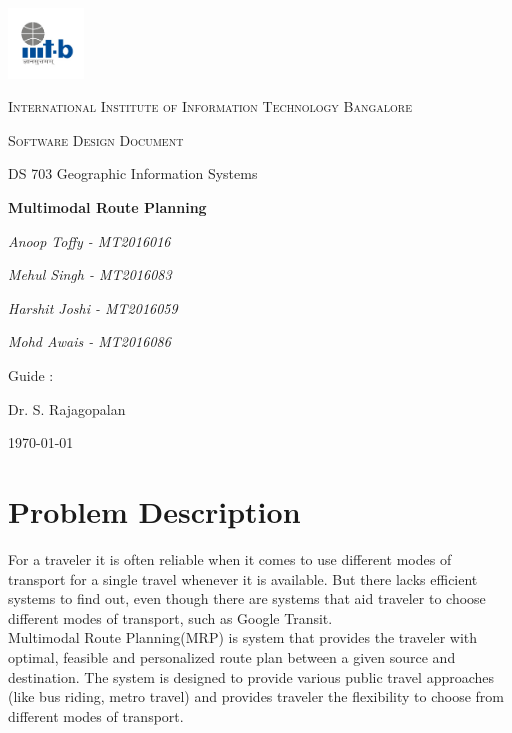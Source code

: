 \documentclass[12pt,a4paper]{article}
\begin{document}
\begin{titlepage}
	\centering
	\includegraphics[width=0.15\textwidth]{IIIT-B_logo.jpg}\par\vspace{1cm}
	{\scshape\LARGE International Institute of Information Technology Bangalore \par}
	\vspace{1cm}
	{\scshape\Large Software Design Document\par}
	{\Large DS 703 Geographic Information Systems\par}
	\vspace{1.5cm}
	{\huge\bfseries Multimodal Route Planning\par}
	\vspace{2cm}	   
	{\Large\itshape Anoop Toffy - MT2016016\par}
	{\Large\itshape Mehul Singh - MT2016083\par}		 
	{\Large\itshape Harshit Joshi - MT2016059\par}	 
	{\Large\itshape Mohd Awais - MT2016086\par}
	\vfill
	Guide : \par
	Dr. S. Rajagopalan

	\vfill

	{\large \today\par}
\end{titlepage}


\tableofcontents
\listoffigures
\listoftables
\newpage

\section{Problem Description}
For a traveler it is often reliable when it comes to use different modes of transport for a single travel whenever it is available. But there lacks efficient systems to find out, even though there are systems that aid traveler to choose different modes of transport, such as Google Transit. \\
Multimodal Route Planning(MRP) is system that provides the traveler with optimal, feasible and personalized route plan between a given source and destination. The system is designed to provide various public travel approaches (like bus riding, metro travel) and provides traveler the flexibility to choose from different modes of transport.
\end{document}
